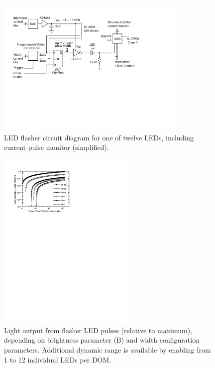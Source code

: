 \begin{figure}[h]
 \centering
 \includegraphics[width=0.8\textwidth]{graphics/dom/functional/domfig4-FlasherDiagram.pdf}
 \caption{LED flasher circuit diagram for one of twelve LEDs, including current pulse monitor (simplified).}
 \label{fig:flasherdiagram}
\end{figure}

\begin{figure}[h]
 \centering
 \includegraphics[width=0.6\textwidth]{graphics/dom/functional/domfig5-BrightnessModel.pdf}
 \caption{Light output from flasher LED pulses (relative to maximum), depending
on brightness parameter (B) and width configuration parameters.  Additional dynamic range is available
by enabling from 1 to 12 individual LEDs per DOM.}
 \label{fig:flasheroutput}
\end{figure}

